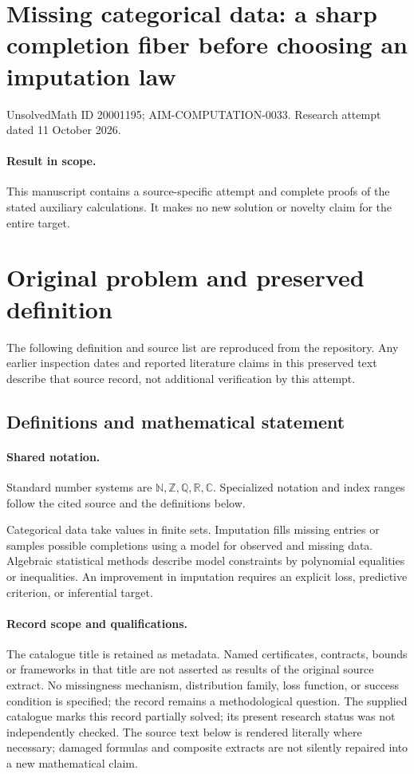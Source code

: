 \documentclass[11pt]{article}
\begin{document}
\section*{Missing categorical data: a sharp completion fiber before choosing an imputation law}
\noindent UnsolvedMath ID 20001195; AIM-COMPUTATION-0033. Research attempt dated 11 October 2026.
\paragraph{Result in scope.}This manuscript contains a source-specific attempt and complete proofs of the stated auxiliary calculations. It makes no new solution or novelty claim for the entire target.
\section{Original problem and preserved definition}
The following definition and source list are reproduced from the repository. Any earlier inspection dates and reported literature claims in this preserved text describe that source record, not additional verification by this attempt.
\subsection{Definitions and mathematical statement}

\paragraph{Shared notation.}Standard number systems are $\mathbb N,\mathbb Z,\mathbb Q,\mathbb R,\mathbb C$. Specialized notation and index ranges follow the cited source and the definitions below.


Categorical data take values in finite sets. Imputation fills missing entries or samples possible completions using a model for observed and missing data. Algebraic statistical methods describe model constraints by polynomial equalities or inequalities. An improvement in imputation requires an explicit loss, predictive criterion, or inferential target.
\paragraph{Record scope and qualifications.}
The catalogue title is retained as metadata. Named certificates, contracts, bounds or frameworks in that title are not asserted as results of the original source extract.
No missingness mechanism, distribution family, loss function, or success condition is specified; the record remains a methodological question. The supplied catalogue marks this record partially solved; its present research status was not independently checked.
The source text below is rendered literally where necessary; damaged formulas and composite extracts are not silently repaired into a new mathematical claim.
\end{document}
